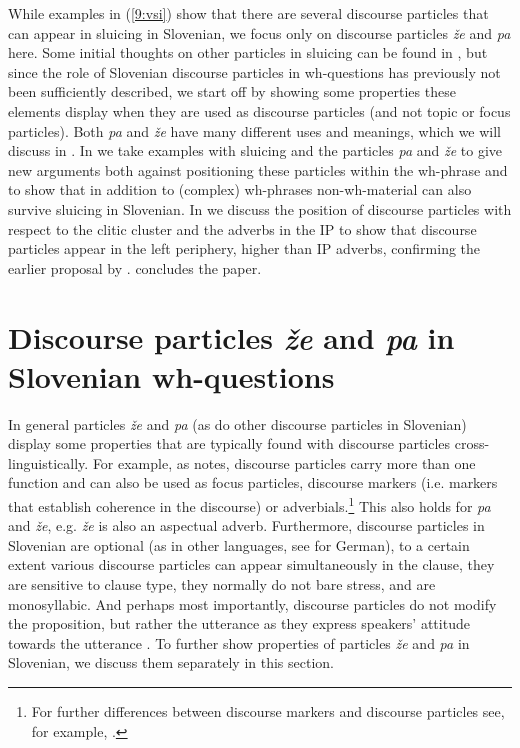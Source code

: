 \documentclass[output=paper,modfonts,newtxmath,hidelinks]{langscibook}
\begin{document}
\noindent While examples in (\ref{9:vsi}) show that there are several discourse particles that can appear in sluicing in Slovenian, we focus only on discourse particles \textit{že} and \textit{pa} here. Some initial thoughts on other particles in sluicing can be found in \cite{marusicetal2015}, but since the role of Slovenian discourse particles in wh-questions has previously not been sufficiently described, we start off by showing some properties these elements display when they are used as discourse particles (and not topic or focus particles). Both \textit{pa} and \textit{že} have many different uses and meanings, which we will discuss in . In  we take examples with sluicing and the particles \textit{pa} and \textit{že} to give new arguments both against positioning these particles within the wh-phrase and to show that in addition to (complex) wh-phrases non-wh-material can also survive sluicing in Slovenian. In  we discuss the position of discourse particles with respect to the  clitic cluster and the adverbs in the IP to show that discourse particles appear in the left periphery, higher than IP adverbs, confirming the earlier proposal by \cite{marusicetal2015}.  concludes the paper.


\section{Discourse particles \textit{že} and \textit{pa} in Slovenian wh-questions}\label{9:s2}

In general particles \textit{že} and \textit{pa} (as do other discourse particles in Slovenian) display some properties that are typically found with discourse particles cross-lingui\-sti\-cal\-ly. For example, as \cite{zimmermann2011} notes, discourse particles carry more than one function and can also be used as focus particles, discourse markers (i.e. markers that establish coherence in the discourse) or adverbials.\footnote{For further differences between discourse markers and discourse particles see, for example, \cite{zimmermann2011}.} This also holds for \textit{pa} and \textit{že}, e.g. \textit{že} is also an aspectual adverb. Furthermore, discourse particles in Slovenian are optional (as in other languages, see \citealt{bayerobenauer2011} for German), to a certain extent various discourse particles can appear simultaneously in the clause, they are sensitive to clause type, they normally do not bare stress, and are monosyllabic. And perhaps most importantly, discourse particles do not modify the proposition, but rather the utterance \citep{bayerobenauer2011} as they express speakers' attitude towards the utterance \citep{zimmermann2011}. To further show properties of particles \textit{že} and \textit{pa} in Slovenian, we discuss them separately in this section. 
\end{document}
